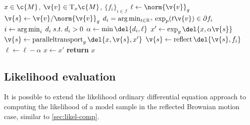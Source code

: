 \begin{algorithm}[t]
	\begin{algorithmic}
		\Require \(x \in \c{M}\), \(\v{v} \in \mathrm{T}_x\c{M}\), \(\{f_i\}_{i \in \mathcal{I}}\)
		\State \(\ell \gets \norm{\v{v}}_{g}\)
		\State \(\v{s} \gets \v{v} / \norm{\v{v}}_{g}\)
		\State \(d_i = \arg\min_{t\in\R^+} \exp_p(t\v{v}) \in \partial f_i\) 
		\State \(i \gets \operatorname*{\arg\min}_i\; d_i \; s.t. \; d_i > 0\) 
		\State \(\alpha \gets \min\del{d_i, \ell} \) 
		\State \(x' \gets \exp_{g}\del{x, \alpha\v{s}}\) 
		\State \(\v{s} \gets \paralleltransport_{g}\del{x, \v{s}, x'} \) 
		\State \(\v{s} \gets \reflect\del{\v{s}, f_i}\) 
		\State \(\ell \gets \ell - \alpha\) 
		\State \(x \gets x'\)
		\EndWhile
		\State \textbf{return} \(x\)
	\end{algorithmic}
	\caption[]{
		\protect{}The algorithm operates by repeatedly taking geodesic steps until one of the constraints is violated or the step is fully taken.
		Upon hitting the boundary we parallel transport the tangent vector to the boundary and then reflect it against the boundary.
		We then start a new geodesic from this point in the new direction.
		The \({\arg} \intersect_t\) function computes the distance one must travel along a geodesic in direction \(\v{s}\) until constraint \(f_i\) is intersected.
		For a discussion of boundary intersection, \(\paralleltransport\), \(\exp_{g}\) and \(\reflect\) please see \cref{def:boundary_intersection,def:manifold_reflection}.
	}
	\label{alg:reflection}
\end{algorithm}


\subsection{Likelihood evaluation}
It is possible to extend the likelihood ordinary differential equation approach to computing the likelihood of a model sample in the reflected Brownian motion case, similar to \cref{sec:likel-comp}.

